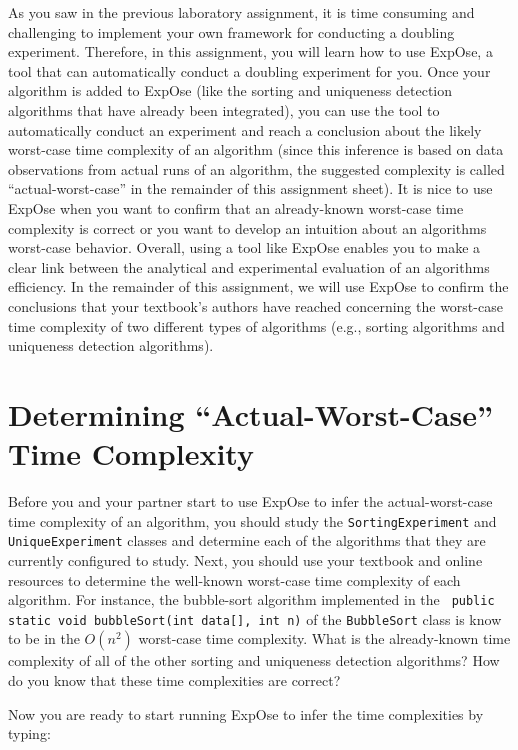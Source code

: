 As you saw in the previous laboratory assignment, it is time consuming and challenging to implement your own framework
for conducting a doubling experiment. Therefore, in this assignment, you will learn how to use {\sc ExpOse}, a tool that
can automatically conduct a doubling experiment for you. Once your algorithm is added to {\sc ExpOse} (like the sorting
and uniqueness detection algorithms that have already been integrated), you can use the tool to automatically conduct an
experiment and reach a conclusion about the likely worst-case time complexity of an algorithm (since this inference is
based on data observations from actual runs of an algorithm, the suggested complexity is called ``actual-worst-case'' in
the remainder of this assignment sheet). It is nice to use {\sc ExpOse} when you want to confirm that an already-known
worst-case time complexity is correct or you want to develop an intuition about an algorithms worst-case behavior.
Overall, using a tool like {\sc ExpOse} enables you to make a clear link between the analytical and experimental
evaluation of an algorithms efficiency. In the remainder of this assignment, we will use {\sc ExpOse} to confirm the
conclusions that your textbook's authors have reached concerning the worst-case time complexity of two different types of
algorithms (e.g., sorting algorithms and uniqueness detection algorithms).

\section*{Determining ``Actual-Worst-Case'' Time Complexity}

Before you and your partner start to use {\sc ExpOse} to infer the actual-worst-case time complexity of an algorithm,
you should study the {\tt SortingExperiment} and {\tt UniqueExperiment} classes and determine each of the algorithms
that they are currently configured to study. Next, you should use your textbook and online resources to determine the
well-known worst-case time complexity of each algorithm. For instance, the bubble-sort algorithm implemented in the {\tt
public static void bubbleSort(int data[], int n)} of the {\tt BubbleSort} class is know to be in the $O(n^2)$ worst-case
time complexity. What is the already-known time complexity of all of the other sorting and uniqueness detection
algorithms? How do you know that these time complexities are correct?

\noindent Now you are ready to start running {\sc ExpOse} to infer the time complexities by typing:

